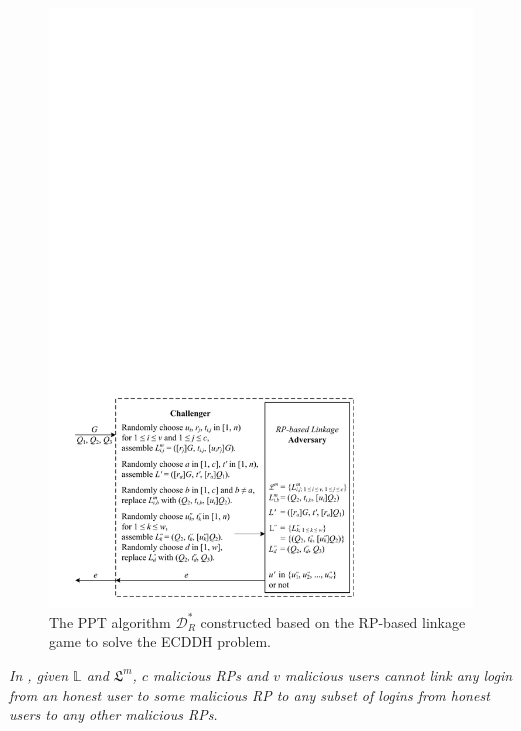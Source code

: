 \begin{figure}[tb]
  \centering
  \includegraphics[width=1.0\linewidth]{fig/rp-linkage-game.pdf}
  \caption{The PPT algorithm $\mathcal{D}^*_R$ constructed based on the RP-based linkage game to solve the ECDDH problem.}
  \label{fig:dalgorithm}
\end{figure}


\begin{thm}[RP Unlinkability]
\emph{In \usso, given $\mathbb{L}$ and $\mathfrak{L}^m$, $c$ malicious RPs and $v$ malicious users cannot link any login from an honest user to some malicious RP to any subset of logins from honest users to any other malicious RPs.}\label{thm-rp-unlinkability}
\end{thm}
\vspace{-1.2mm}

